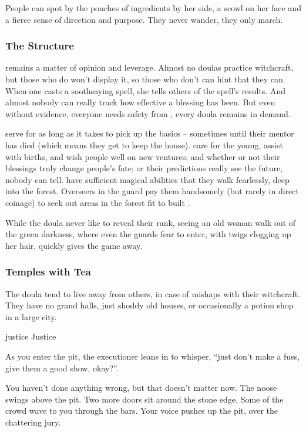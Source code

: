 \begin{multicols}{2}
People can spot  by the pouches of \glspl{ingredient} by her side, a scowl on her face and a fierce sense of direction and purpose.
They never wander, they only march.

\subsubsection{The Structure}
remains a matter of opinion and leverage.
Almost no \glspl{doula} practice witchcraft, but those who do won't display it, so those who don't can hint that they can.
When one casts a soothsaying spell, she tells others of the spell's results.
And almost nobody can really track how effective a blessing has been.
But even without evidence, everyone needs safety from \hphantom{Nulla}, every \gls{doula} remains in demand.

\begin{description}
  serve for as long as it takes to pick up the basics -- sometimes until their mentor has died (which means they get to keep the house).
  care for the young, assist with births, and wish people well on new ventures; and whether or not their blessings truly change people's fate; or their predictions really see the future, nobody can tell.
  have sufficient magical abilities that they walk fearlessly, deep into the forest.
  Overseers in the \gls{guard} pay them handsomely (but rarely in direct coinage) to seek out areas in the forest fit to built .

  While the doula never like to reveal their rank, seeing an old woman walk out of the green darkness, where even the \glspl{guard} fear to enter, with twigs clogging up her hair, quickly gives the game away.
\end{description}

\subsubsection{Temples with Tea}
The doula tend to live away from others, in case of mishaps with their witchcraft.
They have no grand halls, just shoddy old houses, or occasionally a potion shop in a large city.

  {\gls{justice}}%
  {Justice}%
  {
    As you enter the pit, the executioner leans in to whisper, ``just don't make a fuss, give them a good show, okay?''.

    You haven't done anything wrong, but that doesn't matter now.
    The noose swings above the pit.
    Two more doors sit around the stone edge.
    Some of the crowd wave to you through the bars.
    Your voice pushes up the pit, over the chattering jury.

}
\end{multicols}
